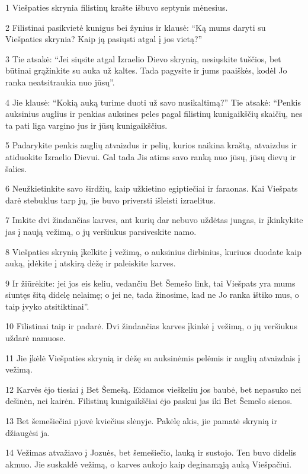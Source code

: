 \par 1 Viešpaties skrynia filistinų krašte išbuvo septynis mėnesius. 
\par 2 Filistinai pasikvietė kunigus bei žynius ir klausė: “Ką mums daryti su Viešpaties skrynia? Kaip ją pasiųsti atgal į jos vietą?” 
\par 3 Tie atsakė: “Jei siųsite atgal Izraelio Dievo skrynią, nesiųskite tuščios, bet būtinai grąžinkite su auka už kaltes. Tada pagysite ir jums paaiškės, kodėl Jo ranka neatsitraukia nuo jūsų”. 
\par 4 Jie klausė: “Kokią auką turime duoti už savo nusikaltimą?” Tie atsakė: “Penkis auksinius auglius ir penkias auksines peles pagal filistinų kunigaikščių skaičių, nes ta pati liga vargino jus ir jūsų kunigaikščius. 
\par 5 Padarykite penkis auglių atvaizdus ir pelių, kurios naikina kraštą, atvaizdus ir atiduokite Izraelio Dievui. Gal tada Jis atims savo ranką nuo jūsų, jūsų dievų ir šalies. 
\par 6 Neužkietinkite savo širdžių, kaip užkietino egiptiečiai ir faraonas. Kai Viešpats darė stebuklus tarp jų, jie buvo priversti išleisti izraelitus. 
\par 7 Imkite dvi žindančias karves, ant kurių dar nebuvo uždėtas jungas, ir įkinkykite jas į naują vežimą, o jų veršiukus parsiveskite namo. 
\par 8 Viešpaties skrynią įkelkite į vežimą, o auksinius dirbinius, kuriuos duodate kaip auką, įdėkite į atskirą dėžę ir paleiskite karves. 
\par 9 Ir žiūrėkite: jei jos eis keliu, vedančiu Bet Šemešo link, tai Viešpats yra mums siuntęs šitą didelę nelaimę; o jei ne, tada žinosime, kad ne Jo ranka ištiko mus, o taip įvyko atsitiktinai”. 
\par 10 Filistinai taip ir padarė. Dvi žindančias karves įkinkė į vežimą, o jų veršiukus uždarė namuose. 
\par 11 Jie įkėlė Viešpaties skrynią ir dėžę su auksinėmis pelėmis ir auglių atvaizdais į vežimą. 
\par 12 Karvės ėjo tiesiai į Bet Šemešą. Eidamos vieškeliu jos baubė, bet nepasuko nei dešinėn, nei kairėn. Filistinų kunigaikščiai ėjo paskui jas iki Bet Šemešo sienos. 
\par 13 Bet šemešiečiai pjovė kviečius slėnyje. Pakėlę akis, jie pamatė skrynią ir džiaugėsi ja. 
\par 14 Vežimas atvažiavo į Jozuės, bet šemešiečio, lauką ir sustojo. Ten buvo didelis akmuo. Jie suskaldė vežimą, o karves aukojo kaip deginamąją auką Viešpačiui. 
